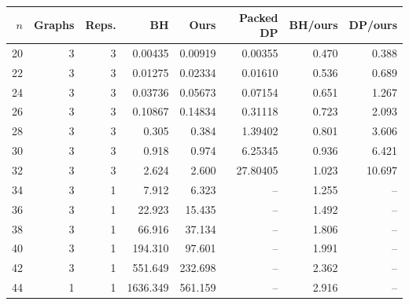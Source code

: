 \begin{tabular}{rrrrrrrr}
\toprule
$n$ & Graphs & Reps. & BH & Ours & Packed DP & BH/ours & DP/ours\\
\midrule
20 & 3 & 3 & 0.00435 & 0.00919 & 0.00355 & 0.470 & 0.388\\
22 & 3 & 3 & 0.01275 & 0.02334 & 0.01610 & 0.536 & 0.689\\
24 & 3 & 3 & 0.03736 & 0.05673 & 0.07154 & 0.651 & 1.267\\
26 & 3 & 3 & 0.10867 & 0.14834 & 0.31118 & 0.723 & 2.093\\
28 & 3 & 3 & 0.305 & 0.384 & 1.39402 & 0.801 & 3.606\\
30 & 3 & 3 & 0.918 & 0.974 & 6.25345 & 0.936 & 6.421\\
32 & 3 & 3 & 2.624 & 2.600 & 27.80405 & 1.023 & 10.697\\
34 & 3 & 1 & 7.912 & 6.323 & -- & 1.255 & --\\
36 & 3 & 1 & 22.923 & 15.435 & -- & 1.492 & --\\
38 & 3 & 1 & 66.916 & 37.134 & -- & 1.806 & --\\
40 & 3 & 1 & 194.310 & 97.601 & -- & 1.991 & --\\
42 & 3 & 1 & 551.649 & 232.698 & -- & 2.362 & --\\
44 & 1 & 1 & 1636.349 & 561.159 & -- & 2.916 & --\\
\bottomrule
\end{tabular}
